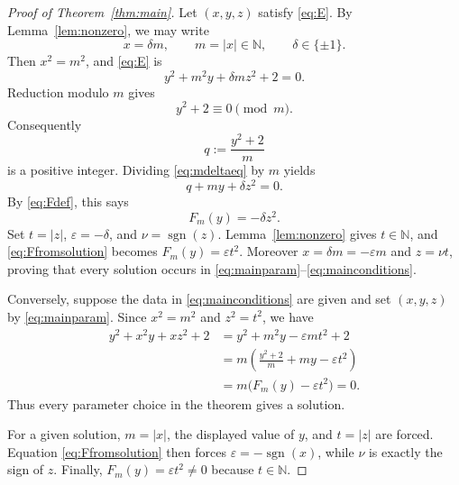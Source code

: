 \documentclass[11pt,a4paper]{amsart}
\numberwithin{equation}{section}
\theoremstyle{definition}
\DeclareMathOperator{\sgn}{sgn}
\newcommand{\N}{\mathbb N}
\begin{document}
\begin{proof}[Proof of Theorem~\ref{thm:main}]
Let \((x,y,z)\) satisfy \eqref{eq:E}.  By Lemma~\ref{lem:nonzero},
we may write
\begin{equation}
 x=\delta m,
 \qquad m=|x|\in\N,
 \qquad \delta\in\{\pm1\}.
 \label{eq:xdelta}
\end{equation}
Then \(x^2=m^2\), and \eqref{eq:E} is
\begin{equation}
 y^2+m^2y+\delta mz^2+2=0.
 \label{eq:mdeltaeq}
\end{equation}
Reduction modulo \(m\) gives
\begin{equation}
 y^2+2\equiv0\pmod m.
 \label{eq:necessarycong}
\end{equation}
Consequently
\begin{equation}
 q:=\frac{y^2+2}{m}
 \label{eq:qdef}
\end{equation}
is a positive integer.  Dividing \eqref{eq:mdeltaeq} by \(m\) yields
\begin{equation}
 q+my+\delta z^2=0.
 \label{eq:linearized}
\end{equation}
By \eqref{eq:Fdef}, this says
\begin{equation}
 F_m(y)=-\delta z^2.
 \label{eq:Ffromsolution}
\end{equation}
Set \(t=|z|\), \(\varepsilon=-\delta\), and
\(\nu=\sgn(z)\).  Lemma~\ref{lem:nonzero} gives \(t\in\N\), and
\eqref{eq:Ffromsolution} becomes \(F_m(y)=\varepsilon t^2\).
Moreover \(x=\delta m=-\varepsilon m\) and \(z=\nu t\), proving that
every solution occurs in \eqref{eq:mainparam}--\eqref{eq:mainconditions}.

Conversely, suppose the data in \eqref{eq:mainconditions} are given and
set \((x,y,z)\) by \eqref{eq:mainparam}.  Since \(x^2=m^2\) and
\(z^2=t^2\), we have
\begin{align*}
 y^2+x^2y+xz^2+2
 &=y^2+m^2y-\varepsilon mt^2+2\\
 &=m\left(\frac{y^2+2}{m}+my-\varepsilon t^2\right)\\
 &=m\bigl(F_m(y)-\varepsilon t^2\bigr)=0.
\end{align*}
Thus every parameter choice in the theorem gives a solution.

For a given solution, \(m=|x|\), the displayed value of \(y\), and
\(t=|z|\) are forced.  Equation \eqref{eq:Ffromsolution} then forces
\(\varepsilon=-\sgn(x)\), while \(\nu\) is exactly the sign of \(z\).
Finally, \(F_m(y)=\varepsilon t^2\ne0\) because \(t\in\N\).
\end{proof}
\end{document}
